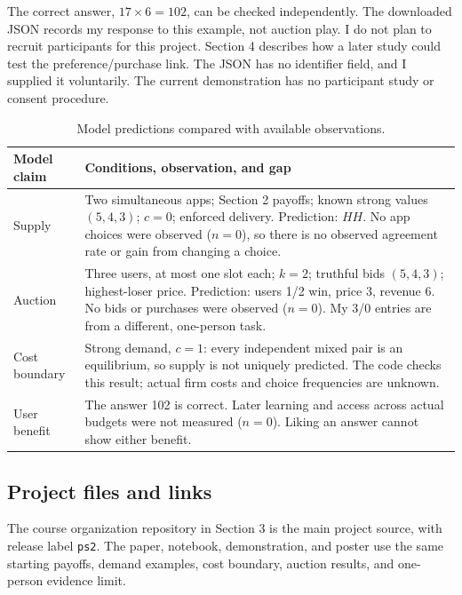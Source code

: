 The correct answer, $17\times6=102$, can be checked independently. The downloaded JSON records my response to this example, not auction play. I do not plan to recruit participants for this project. Section 4 describes how a later study could test the preference/purchase link. The JSON has no identifier field, and I supplied it voluntarily. The current demonstration has no participant study or consent procedure.

\begin{table}[h]\centering
\caption{Model predictions compared with available observations.}
\begin{tabularx}{\columnwidth}{@{}p{1.7cm}Y@{}}\toprule
\textbf{Model claim} & \textbf{Conditions, observation, and gap}\\\midrule
Supply & Two simultaneous apps; Section 2 payoffs; known strong values $(5,4,3)$; $c=0$; enforced delivery. Prediction: $HH$. No app choices were observed ($n=0$), so there is no observed agreement rate or gain from changing a choice.\\
Auction & Three users, at most one slot each; $k=2$; truthful bids $(5,4,3)$; highest-loser price. Prediction: users 1/2 win, price 3, revenue 6. No bids or purchases were observed ($n=0$). My 3/0 entries are from a different, one-person task.\\
Cost boundary & Strong demand, $c=1$: every independent mixed pair is an equilibrium, so supply is not uniquely predicted. The code checks this result; actual firm costs and choice frequencies are unknown.\\
User benefit & The answer 102 is correct. Later learning and access across actual budgets were not measured ($n=0$). Liking an answer cannot show either benefit.\\
\bottomrule\end{tabularx}\end{table}

\subsection{Project files and links}
The course organization repository in Section 3 is the main project source, with release label \texttt{ps2}. The paper, notebook, demonstration, and poster use the same starting payoffs, demand examples, cost boundary, auction results, and one-person evidence limit.

